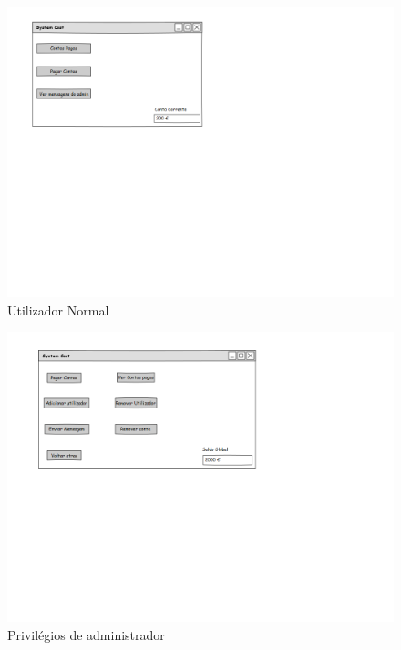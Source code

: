 \begin{figure}[htb!]
	\centering
	\includegraphics[scale=0.4]{UtilizadorNormal}  
	\caption{Utilizador Normal }  
\end{figure}

\begin{figure}[htb!]
	\centering
	\includegraphics[scale=0.4]{Admin}  
	\caption{Privilégios de administrador }  
\end{figure}




